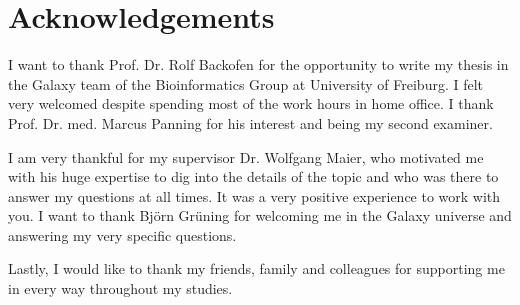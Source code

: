 \chapter*{Acknowledgements}
I want to thank Prof. Dr. Rolf Backofen for the opportunity to write my thesis in the Galaxy team of the Bioinformatics Group at University of Freiburg. I felt very welcomed despite spending most of the work hours in home office. I thank Prof. Dr. med. Marcus Panning for his interest and being my second examiner.

I am very thankful for my supervisor Dr. Wolfgang Maier, who motivated me with his huge expertise to dig into the details of the topic and who was there to answer my questions at all times. It was a very positive experience to work with you. I want to thank Björn Grüning for welcoming me in the Galaxy universe and answering my very specific questions.

Lastly, I would like to thank my friends, family and colleagues for supporting me in every way throughout my studies.
